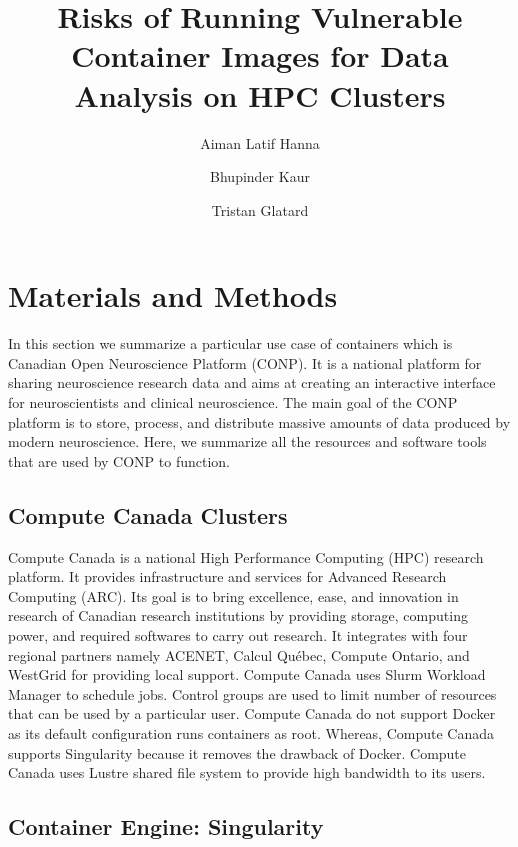 \documentclass[a4paper,num-refs]{oup-contemporary}
\title{Risks of Running Vulnerable Container Images for Data Analysis on HPC
Clusters}
\begin{document}
\author[1]{Aiman Latif Hanna}
\author[1]{Bhupinder Kaur}
\author[1]{Tristan Glatard}


\maketitle


\section{Materials and Methods}

In this section we summarize a particular use case of containers which is Canadian
Open Neuroscience Platform (CONP). It is a national platform for sharing neuroscience
research data and aims at creating an interactive interface for neuroscientists and
clinical neuroscience. The main goal of the CONP platform is to store, process, and
distribute massive amounts of data produced by modern neuroscience.
Here, we summarize all the resources and software tools that are
used by CONP to function.

\subsection{Compute Canada Clusters}

Compute Canada is a national High Performance Computing (HPC) research platform.
It provides infrastructure and services for Advanced Research Computing (ARC).
Its goal is to bring excellence, ease, and innovation in research of Canadian
research institutions by providing storage, computing power, and required
softwares to carry out research.
It integrates with four regional partners namely ACENET, Calcul Québec, Compute
Ontario, and WestGrid for providing local support.
Compute Canada uses Slurm Workload Manager to schedule jobs.
Control groups are used to limit number of resources that can be used
by a particular user.
Compute Canada do not support Docker as its default configuration
runs containers as root. Whereas, Compute Canada supports Singularity
because it removes the drawback of Docker.
Compute Canada uses Lustre shared file system to provide high
bandwidth to its users.

\subsection{Container Engine: Singularity}
\end{document}
